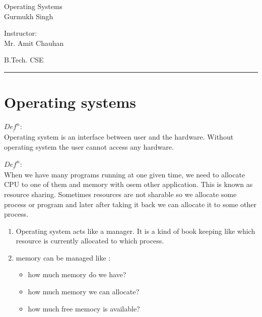 \documentclass[12pt,letterpaper]{article}
\newenvironment{definition}
	{\begin{mdframed}$\underline{\textit{Def}^\textit{n}:} $\\}
	{\end{mdframed}}
\begin{document}
\begin{center}
  \Huge{Operating Systems}\\
  \vspace{0.25cm}
  \small{Gurmukh Singh}
\end{center}

\vspace{-1.75cm}

\begin{flushright}
  Instructor: \\ Mr. Amit Chauhan
\end{flushright}

\vspace{-1.3cm}

\begin{flushleft}
  B.Tech. CSE
\end{flushleft}

\rule{15.5cm}{0.1mm}%

\tableofcontents
\pagebreak


\section{Operating systems}
\begin{definition}
  Operating system is an interface between user and the hardware.
  Without operating system the user cannot access any hardware. 
\end{definition}

\begin{definition}
   When we have many programs running at one given time, we need to allocate CPU to one of them and memory with osem other application. 
   This is known as resource sharing. Sometimes resources are not sharable so we allocate some process or program and later after taking it back we can allocate it to some other process. 
\end{definition}
 
\begin{enumerate}
  \item Operating system acts like a manager. It is a kind of book keeping like which resource is currently allocated to which process. 
  \item memory can be managed like : 
    \begin{itemize}
      \item how much memory do we have?
      \item how much memory we can allocate? 
      \item how much free memocy is available?
    \end{itemize}
\end{enumerate}
\end{document}
